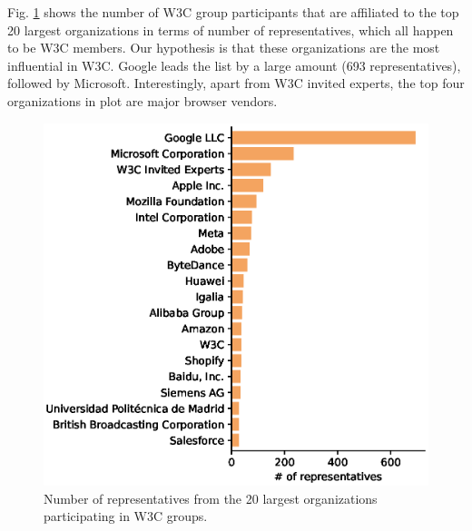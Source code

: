 \documentclass[sigconf, nonacm]{acmart}              %
\begin{document}
Fig. \ref{fig:reps-per-org} shows the number of W3C group participants that are affiliated to the top 20 largest organizations in terms of number of representatives, which all happen to be W3C members. Our hypothesis is that these organizations are the most influential in W3C. Google leads the list by a large amount (693 representatives), followed by Microsoft. Interestingly, apart from W3C invited experts, the top four organizations in plot are major browser vendors. 

\begin{figure}[ht]
  \centering
  \includegraphics[width=1.0\columnwidth]{images/n-reps-per-org.eps}
  \caption{Number of representatives from the 20 largest organizations participating in W3C groups.}
  \label{fig:reps-per-org}
\end{figure}
\end{document}
